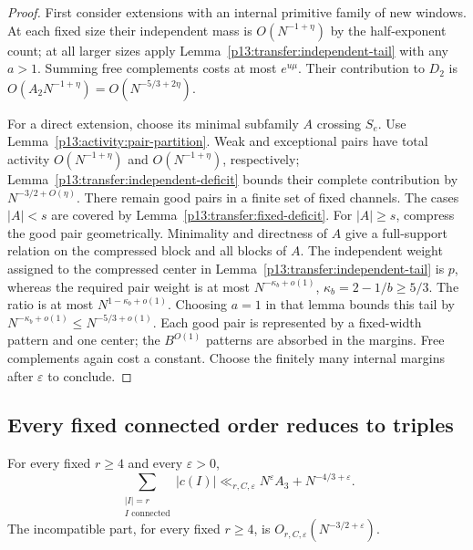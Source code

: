 \begin{proof}
First consider extensions with an internal primitive family of new
windows. At each fixed size their independent mass is $O(N^{-1+\eta})$
by the half-exponent count; at all larger sizes apply
Lemma~\ref{p13:transfer:independent-tail} with any $a>1$.
Summing free complements costs at most $e^{u\mu}$. Their contribution
to $D_2$ is $O(A_2N^{-1+\eta})=O(N^{-5/3+2\eta})$.

For a direct extension, choose its minimal subfamily $A$ crossing $S_e$.
Use Lemma~\ref{p13:activity:pair-partition}. Weak and exceptional pairs
have total activity $O(N^{-1+\eta})$ and $O(N^{-1+\eta})$,
respectively; Lemma~\ref{p13:transfer:independent-deficit} bounds their
complete contribution by $N^{-3/2+O(\eta)}$.
There remain good pairs in a finite set of fixed channels. The cases
$|A|<s$ are covered by Lemma~\ref{p13:transfer:fixed-deficit}.
For $|A|\geq s$, compress the good pair geometrically. Minimality and
directness of $A$ give a full-support relation on the compressed block
and all blocks of $A$. The independent weight assigned to the
compressed center in Lemma~\ref{p13:transfer:independent-tail} is $p$,
whereas the required pair weight is at most $N^{-\kappa_b+o(1)}$,
$\kappa_b=2-1/b\geq5/3$. The ratio is at most
$N^{1-\kappa_b+o(1)}$. Choosing $a=1$ in that lemma bounds this tail
by $N^{-\kappa_b+o(1)}\leq N^{-5/3+o(1)}$.
Each good pair is represented by a fixed-width pattern and one center;
the $B^{O(1)}$ patterns are absorbed in the margins. Free complements
again cost a constant. Choose the finitely many internal margins after
$\varepsilon$ to conclude.
\end{proof}

\subsection{Every fixed connected order reduces to triples}

\begin{proposition}
\label{p13:transfer:fixed-activities}
For every fixed $r\geq4$ and every $\varepsilon>0$,
\begin{equation}
 \sum_{\substack{|I|=r\\I\text{ connected}}}|c(I)|
 \ll_{r,C,\varepsilon}N^\varepsilon A_3+N^{-4/3+\varepsilon}.
 \label{p13:transfer:fixed-activity-bound}
\end{equation}
The incompatible part, for every fixed $r\geq4$, is
$O_{r,C,\varepsilon}(N^{-3/2+\varepsilon})$.
\end{proposition}


